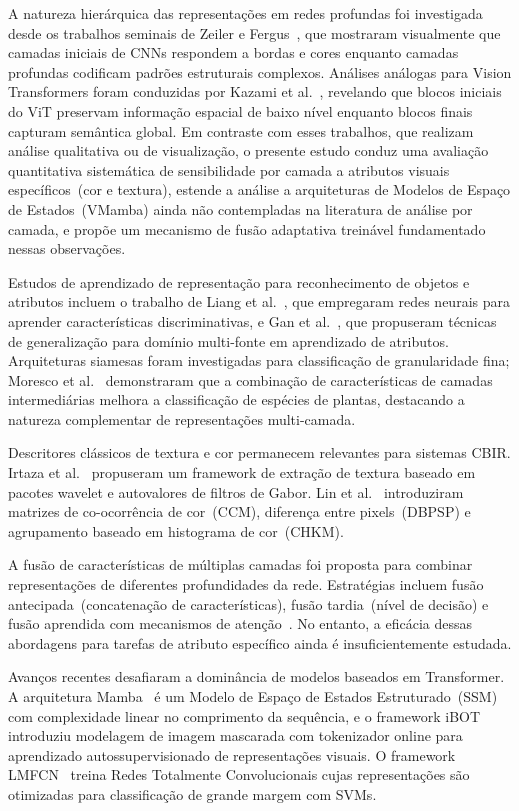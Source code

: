 \documentclass[letterpaper, 10 pt, conference]{ieeeconf}
\begin{document}
A natureza hierárquica das representações em redes profundas foi investigada
desde os trabalhos seminais de Zeiler e Fergus~\cite{bzeiler}, que mostraram
visualmente que camadas iniciais de CNNs respondem a bordas e cores enquanto
camadas profundas codificam padrões estruturais complexos.
Análises análogas para Vision Transformers foram conduzidas por
Kazami et al.~\cite{bkazami}, revelando que blocos iniciais do ViT preservam
informação espacial de baixo nível enquanto blocos finais capturam semântica
global.
Em contraste com esses trabalhos, que realizam análise qualitativa ou de
visualização, o presente estudo conduz uma avaliação quantitativa sistemática
de sensibilidade por camada a atributos visuais específicos~(cor e textura),
estende a análise a arquiteturas de Modelos de Espaço de Estados~(VMamba)
ainda não contempladas na literatura de análise por camada, e propõe um
mecanismo de fusão adaptativa treinável fundamentado nessas observações.

Estudos de aprendizado de representação para reconhecimento de objetos e
atributos incluem o trabalho de Liang et al.~\cite{b10}, que empregaram
redes neurais para aprender características discriminativas, e Gan
et al.~\cite{b11}, que propuseram técnicas de generalização para domínio
multi-fonte em aprendizado de atributos.
Arquiteturas siamesas foram investigadas para classificação de granularidade
fina; Moresco et al.~\cite{b8} demonstraram que a combinação de
características de camadas intermediárias melhora a classificação de
espécies de plantas, destacando a natureza complementar de representações
multi-camada.

Descritores clássicos de textura e cor permanecem relevantes para sistemas
CBIR.
Irtaza et al.~\cite{b13} propuseram um framework de extração de textura
baseado em pacotes wavelet e autovalores de filtros de Gabor.
Lin et al.~\cite{b15} introduziram matrizes de co-ocorrência de
cor~(CCM), diferença entre pixels~(DBPSP) e agrupamento baseado em
histograma de cor~(CHKM).

A fusão de características de múltiplas camadas foi proposta para combinar
representações de diferentes profundidades da rede.
Estratégias incluem fusão antecipada~(concatenação de características),
fusão tardia~(nível de decisão) e fusão aprendida com mecanismos de
atenção~\cite{b26,b27}.
No entanto, a eficácia dessas abordagens para tarefas de atributo específico
ainda é insuficientemente estudada.

Avanços recentes desafiaram a dominância de modelos baseados em Transformer.
A arquitetura Mamba~\cite{b16} é um Modelo de Espaço de Estados
Estruturado~(SSM) com complexidade linear no comprimento da sequência, e o
framework iBOT~\cite{b17} introduziu modelagem de imagem mascarada com
tokenizador online para aprendizado autossupervisionado de representações
visuais.
O framework LMFCN~\cite{b28} treina Redes Totalmente Convolucionais cujas
representações são otimizadas para classificação de grande margem com SVMs.
\end{document}
